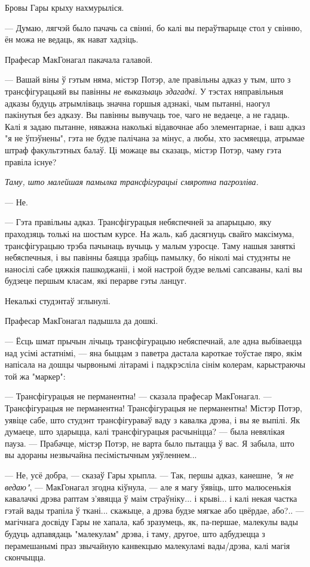 Бровы Гары крыху нахмурыліся.

--- Думаю, лягчэй было пачачь са свінні, бо калі вы пераўтварыце стол у свінню, 
ён можа не ведаць, як нават хадзіць.

Прафесар МакГонагал пакачала галавой.

--- Вашай віны ў гэтым няма, містэр Потэр, але правільны адказ у тым, што 
з трансфігурацыяй вы  павінны \emph{не выказыаць здагадкі}. У тэстах няправільныя адказы 
будуць атрымліваць значна горшыя адзнакі, чым пытанні, наогул пакінутыя без адказу.
Вы павінны вывучаць тое, чаго не ведаеце, а не гадаць. Калі я задаю пытанне, няважна наколькі 
відавочнае або элементарнае, і ваш адказ "я не ўпэўнены", гэта не будзе палічана за мінус,
а любы, хто засмяецца, атрымае штраф факультэтных балаў. Ці можаце вы сказаць, містэр 
Потэр, чаму гэта правіла існуе?

\emph{Таму, што малейшая памылка трансфігурацыі смяротна пагрозліва.}

--- Не.

--- Гэта правільны адказ. Трансфігурацыя небяспечней за апарыцыю, яку праходзяць 
толькі на шостым курсе. На жаль, каб дасягнуць свайго максімума, 
трансфігурацыю трэба пачынаць вучыць у малым узросце. Таму нашыя заняткі небяспечныя,
і вы павінны баяцца зрабіць памылку, бо ніколі маі студэнты не  
наносілі сабе цяжкія пашкоджаніі, і мой настрой будзе вельмі сапсаваны, 
калі вы будзеце першым класам, які перарве гэты ланцуг.

Некалькі студэнтаў зглынулі.

Прафесар МакГонагал падышла да дошкі. 

--- Ёсць шмат прычын лічыць трансфігурацыю небяспечнай, але адна выбіваецца
над усімі астатнімі, --- яна быццам з паветра дастала кароткае тоўстае пяро, якім 
напісала на дошцы чырвонымі літарамі і падкрэсліла сінім колерам, карыстраючы 
той жа "маркер":


--- Трансфігурацыя не перманентна! --- сказала прафесар МакГонагал. --- Трансфігурацыя не перманентна!
Трансфігурацыя не перманентна! Містэр Потэр, уявіце сабе, што студэнт трансфігураваў 
ваду з кавалка дрэва, і вы яе выпілі. Як думаеце, што здарыцца, калі трансфігурацыя 
расчыніцца? --- была невялікая пауза. --- Прабачце, містэр Потэр, не варта 
было пытацца ў вас. Я забыла, што вы адораны незвычайна песімістычным уяўленнем...

--- Не, усё добра, --- сказаў Гары хрыпла. --- Так, першы адказ, канешне, \emph{"я не ведаю"}, --- 
МакГонагал згодна кіўнула, --- але я магу ўявіць, што малюсенькія кавалачкі дрэва 
раптам з'явяцца ў маім страўніку... і крыві... і калі некая частка гэтай вады 
трапіла ў ткані... скажыце, а дрэва будзе мягкае або цвёрдае, або?.. --- 
магічнага досвіду Гары не хапала, каб зразумець, як, па-першае, малекулы вады будуць 
адпавядаць "малекулам" дрэва, і таму, другое, што адбудзецца з перамешанымі 
праз звычайную канвекцыю малекуламі вады/дрэва, калі магія скончыцца.

